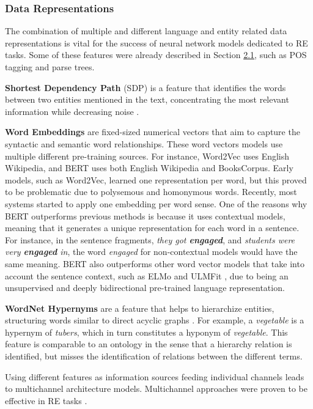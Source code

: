 \hypertarget{2.1.4.3}{\subsubsection{Data Representations}}

The combination of multiple and different language and entity related data representations is vital for the success of neural network models dedicated to RE tasks. Some of these features were already described in Section \hyperlink{2.1}{2.1}, such as POS tagging and parse trees. 

\textbf{Shortest Dependency Path} (SDP) is a feature that identifies the words between two entities mentioned in the text, concentrating the most relevant information while decreasing noise \citep{xu2015classifying}. 

\textbf{Word Embeddings} are fixed-sized numerical vectors that aim to capture the syntactic and semantic word relationships. These word vectors models use multiple different pre-training sources. For instance, Word2Vec \citep{mikolov2013distributed} uses English Wikipedia, and BERT \citep{devlin2019bert} uses both English Wikipedia and BooksCorpus. 
Early models, such as Word2Vec, learned one representation per word, but this proved to be problematic due to polysemous and homonymous words. Recently, most systems started to apply one embedding per word sense. One of the reasons why BERT outperforms previous methods is because it uses contextual models, meaning that it generates a unique representation for each word in a sentence. For instance, in the sentence fragments, \textit{they got \textbf{engaged}}, and \textit{students were very \textbf{engaged} in}, the word \textit{engaged} for non-contextual models would have the same meaning. BERT also outperforms other word vector models that take into account the sentence context, such as ELMo \citep{peters2018deep} and ULMFit \citep{howard2018universal}, due to being an unsupervised and deeply bidirectional pre-trained language representation.

\textbf{WordNet Hypernyms} are a feature that helps to hierarchize entities, structuring words similar to direct acyclic graphs \citep{miller1998wordnet}. For example, a \textit{vegetable} is a hypernym of \textit{tubers}, which in turn constitutes a hyponym of \textit{vegetable}. This feature is comparable to an ontology in the sense that a hierarchy relation is identified, but misses the identification of relations between the different terms.

Using different features as information sources feeding individual channels leads to multichannel architecture models. Multichannel approaches were proven to be effective in RE tasks \citep{xu2015classifying}. 

